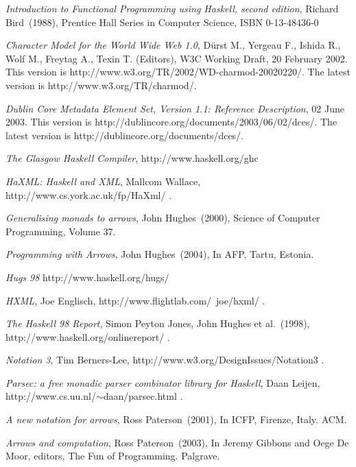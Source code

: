 \documentclass[11pt,a4paper,headsepline, bibtotoc]{scrreprt}
\begin{document}
\begin{thebibliography}{999}

{\it Introduction to Functional Programming using Haskell, second edition},
Richard Bird~(1988),
Prentice Hall Series in Computer Science,
ISBN 0-13-48436-0

\textit{Character Model for the World Wide Web 1.0}, D\"urst M., Yergeau F., Ishida R., Wolf M., Freytag A., Texin T. (Editors), W3C Working Draft, 20 February 2002. This version is http://www.w3.org/TR/2002/WD-charmod-20020220/. The latest version is http://www.w3.org/TR/charmod/.

\textit{Dublin Core Metadata Element Set, Version 1.1: Reference Description}, 02 June 2003. This version is http://dublincore.org/documents/2003/06/02/dces/. The latest version is http://dublincore.org/documents/dces/.

\textit{The Glasgow Haskell Compiler},
http://www.haskell.org/ghc

{\it HaXML: Haskell and XML}, Mallcom Wallace, http://www.cs.york.ac.uk/fp/HaXml/ .

{\it Generalising monads to arrows},
John Hughes~(2000),
Science of Computer Programming, Volume 37.

{\it Programming with Arrows},
John Hughes~(2004),
In AFP, Tartu, Estonia.

\textit{Hugs 98}
http://www.haskell.org/hugs/

{\it HXML}, Joe Englisch, http://www.flightlab.com/~joe/hxml/ .

{\it The Haskell 98 Report},
Simon Peyton Jones, John Hughes et al.~(1998),
http://www.haskell.org/onlinereport/ .

\textit{Notation 3}, Tim Berners-Lee, http://www.w3.org/DesignIssues/Notation3 .

{\sl Parsec: a free monadic parser combinator library
for Haskell}, Daan Leijen, http://www.cs.uu.nl/$\sim$daan/parsec.html .

{\it A new notation for arrows},
Ross Paterson~(2001),
In ICFP, Firenze, Italy. ACM.

{\it Arrows and computation},
Ross Paterson~(2003),
In Jeremy Gibbons and Oege De Moor, editors, The Fun of Programming. Palgrave.


\end{thebibliography}
\end{document}
